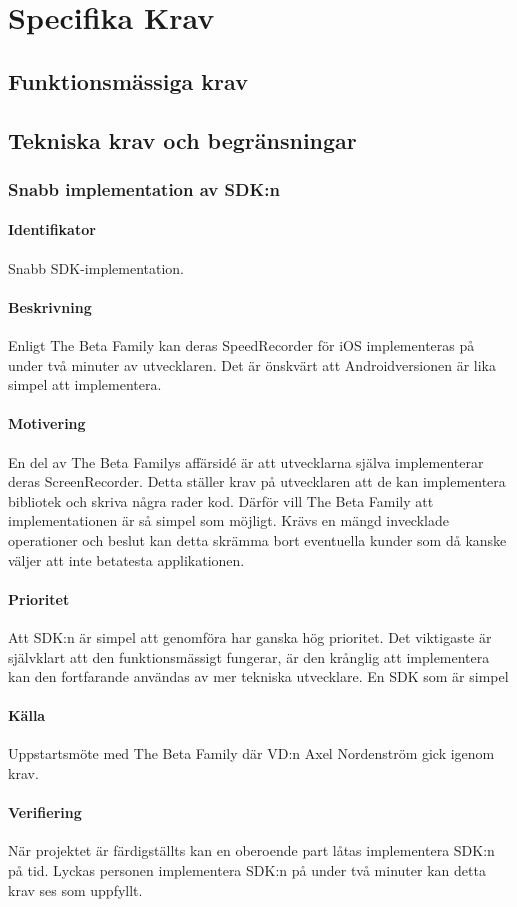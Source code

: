 \section{Specifika Krav}

\subsection{Funktionsmässiga krav}

\subsection{Tekniska krav och begränsningar}
\subsubsection{Snabb implementation av SDK:n}
\paragraph{Identifikator} 
Snabb SDK-implementation.
\paragraph{Beskrivning}
Enligt The Beta Family kan deras SpeedRecorder för iOS implementeras på under två minuter av utvecklaren. Det är önskvärt att Androidversionen är lika simpel att implementera.
\paragraph{Motivering}
En del av The Beta Familys affärsidé är att utvecklarna själva implementerar deras ScreenRecorder. Detta ställer krav på utvecklaren att de kan implementera bibliotek och skriva några rader kod. Därför vill The Beta Family att implementationen är så simpel som möjligt. Krävs en mängd invecklade operationer och beslut kan detta skrämma bort eventuella kunder som då kanske väljer att inte betatesta applikationen.
\paragraph{Prioritet}
Att SDK:n är simpel att genomföra har ganska hög prioritet. Det viktigaste är självklart att den funktionsmässigt fungerar, är den krånglig att implementera kan den fortfarande användas av mer tekniska utvecklare. En SDK som är simpel 
\paragraph{Källa}
Uppstartsmöte med The Beta Family där VD:n Axel Nordenström gick igenom krav.
\paragraph{Verifiering}
När projektet är färdigställts kan en oberoende part låtas implementera SDK:n på tid. Lyckas personen implementera SDK:n på under två minuter kan detta krav ses som uppfyllt.